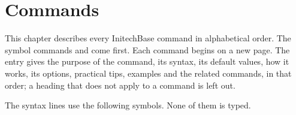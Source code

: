 \chapter{Commands}
This chapter describes every InitechBase command in alphabetical order.  The
symbol commands  and  come first.  Each command begins on a new
page.  The entry gives the purpose of the command, its syntax, its default
values, how it works, its options, practical tips, examples and the related
commands, in that order; a heading that does not apply to a command is left
out.

The syntax lines use the following symbols.  None of them is typed.


